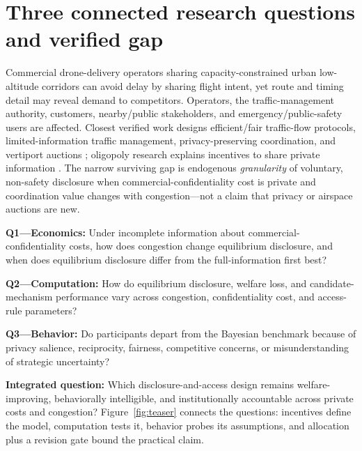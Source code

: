 \section{Three connected research questions and verified gap}
Commercial drone-delivery operators sharing capacity-constrained urban low-altitude corridors can avoid delay by sharing flight intent, yet route and timing detail may reveal demand to competitors. Operators, the traffic-management authority, customers, nearby/public stakeholders, and emergency/public-safety users are affected. Closest verified work designs efficient/fair traffic-flow protocols, limited-information traffic management, privacy-preserving coordination, and vertiport auctions \cite{chin2022efficient,chin2023traffic,maheshwari2025privacy,su2024vertiport}; oligopoly research explains incentives to share private information \cite{raith1996general}. The narrow surviving gap is endogenous \emph{granularity} of voluntary, non-safety disclosure when commercial-confidentiality cost is private and coordination value changes with congestion---not a claim that privacy or airspace auctions are new.

\noindent\textbf{Q1---Economics:} Under incomplete information about commercial-confidentiality costs, how does congestion change equilibrium disclosure, and when does equilibrium disclosure differ from the full-information first best?\par
\noindent\textbf{Q2---Computation:} How do equilibrium disclosure, welfare loss, and candidate-mechanism performance vary across congestion, confidentiality cost, and access-rule parameters?\par
\noindent\textbf{Q3---Behavior:} Do participants depart from the Bayesian benchmark because of privacy salience, reciprocity, fairness, competitive concerns, or misunderstanding of strategic uncertainty?\par
\noindent\textbf{Integrated question:} Which disclosure-and-access design remains welfare-improving, behaviorally intelligible, and institutionally accountable across private costs and congestion? Figure~\ref{fig:teaser} connects the questions: incentives define the model, computation tests it, behavior probes its assumptions, and allocation plus a revision gate bound the practical claim.

